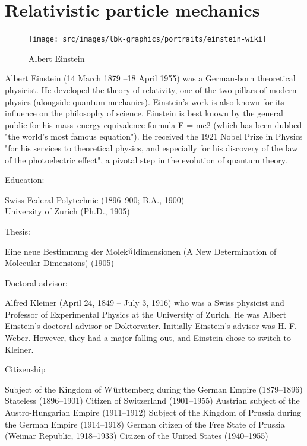 \chapter{Relativistic particle mechanics}


\newpage
\begin{figure}[H]
\centering
\texttt{[image: src/images/lbk-graphics/portraits/einstein-wiki]}
\caption*{Albert Einstein}
\end{figure}


\begin{small}
Albert Einstein (14 March 1879 --18 April 1955) was a 
German-born theoretical physicist. He developed the theory 
of relativity, one of the two pillars of modern physics 
(alongside quantum mechanics).  Einstein's work is 
also known for its influence on the philosophy of 
science.  Einstein is best known by the general public 
for his mass--energy equivalence formula E = mc2 (which has 
been dubbed "the world's most famous equation").  He 
received the 1921 Nobel Prize in Physics "for his services 
to theoretical physics, and especially for his discovery of 
the law of the photoelectric effect", a pivotal step in 
the evolution of quantum theory.

\newpage
Education: 	

    Swiss Federal Polytechnic (1896--900; B.A., 1900)\\
    University of Zurich (Ph.D., 1905)

Thesis: 	

Eine neue Bestimmung der Molek$\breve{\rm 
u}$ldimensionen (A New Determination of Molecular 
Dimensions) (1905)

Doctoral advisor:

Alfred Kleiner (April 24, 1849 -- July 3, 
1916) who was  a Swiss physicist and Professor of 
Experimental Physics at the University of Zurich. He was 
Albert Einstein's doctoral advisor or Doktorvater. 
Initially Einstein's advisor was H. F. Weber. However, they 
had a major falling out, and Einstein chose to switch to 
Kleiner.

Citizenship 	

Subject of the Kingdom of W$\breve{\rm u}$rttemberg during 
the German Empire (1879--1896)
    Stateless (1896--1901)
    Citizen of Switzerland (1901--1955)
    Austrian subject of the Austro-Hungarian Empire 
(1911--1912)
    Subject of the Kingdom of Prussia during the German 
Empire (1914--1918)
    German citizen of the Free State of Prussia (Weimar 
Republic, 1918--1933)
    Citizen of the United States (1940--1955)


\end{small}
